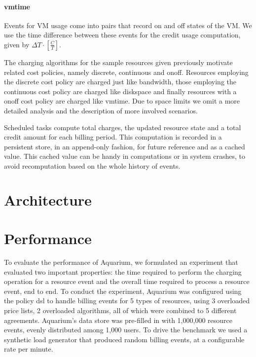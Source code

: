 \documentclass[letterpaper,twocolumn,10pt]{article}
\begin{document}
\paragraph{\textsf{vmtime}}
Events for VM usage come into pairs that record \textsf{on} and
\textsf{off} states of the VM. We use the time difference between
these events for the credit usage computation, given by $\Delta T
\cdot [ \frac{C}{T} ]$.

The charging algorithms for the sample resources given previously
motivate related cost policies, namely \textsf{discrete},
\textsf{continuous} and \textsf{onoff}. Resources employing the
\textsf{discrete} cost policy are charged just like
\textsf{bandwidth}, those employing the \textsf{continuous} cost
policy are charged like \textsf{diskspace} and finally resources with
a \textsf{onoff} cost policy are charged like \textsf{vmtime}. Due to
space limits we omit a more detailed analysis and the description of
more involved scenarios.

Scheduled tasks compute total charges, the updated resource state and
a total credit amount for each billing period. This computation is
recorded in a persistent store, in an append-only fashion, for future
reference and as a cached value. This cached value can be handy in
computations or in system crashes, to avoid recomputation based on the
whole history of events.

\section{Architecture}


\section{Performance}

To evaluate the performance of Aquarium, we formulated an experiment that
evaluated two important properties: the time required to perform the charging
operation for a resource event and the overall time required to process a
resource event, end to end. To conduct the experiment, Aquarium was configured
using the policy {\sc dsl} to handle billing events for 5 types of resources,
using 3 overloaded price lists, 2 overloaded algorithms, all of which were
combined to 5 different agreements. Aquarium's data store was pre-filled in
with 1,000,000 resource events, evenly distributed among 1,000 users. To drive
the benchmark we used a synthetic load generator that produced random billing
events, at a configurable rate per minute.
\end{document}
